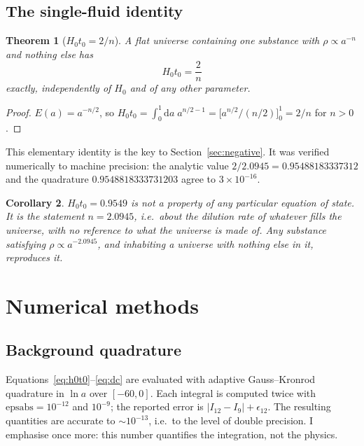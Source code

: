 \documentclass[11pt,a4paper]{article}
\newtheorem{theorem}{Theorem}[section]
\newtheorem{corollary}[theorem]{Corollary}
\theoremstyle{definition}
\newcommand{\Hzt}{H_0 t_0}
\begin{document}
\subsection{The single-fluid identity}

\begin{theorem}[$\Hzt = 2/n$]
\label{thm:twon}
A flat universe containing one substance with $\rho \propto a^{-n}$ and
nothing else has
\begin{equation}
\Hzt = \frac{2}{n}
\label{eq:twon}
\end{equation}
exactly, independently of $H_0$ and of any other parameter.
\end{theorem}

\begin{proof}
$E(a) = a^{-n/2}$, so
$\Hzt = \int_0^1 \mathrm{d}a\; a^{n/2-1} = \big[a^{n/2}/(n/2)\big]_0^1 = 2/n$
for $n > 0$.
\end{proof}

This elementary identity is the key to Section~\ref{sec:negative}. It was
verified numerically to machine precision: the analytic value
$2/2.0945 = 0.95488183337312$ and the quadrature
$0.9548818333731203$ agree to $3\times10^{-16}$.

\begin{corollary}
$\Hzt = 0.9549$ is not a property of any particular equation of state. It is
the statement $n = 2.0945$, i.e.\ about the \emph{dilution rate of whatever
fills the universe}, with no reference to what the universe is made of. Any
substance satisfying $\rho \propto a^{-2.0945}$, and inhabiting a universe
with nothing else in it, reproduces it.
\end{corollary}

\section{Numerical methods}
\label{sec:methods}

\subsection{Background quadrature}

Equations~\eqref{eq:h0t0}--\eqref{eq:dc} are evaluated with adaptive
Gauss--Kronrod quadrature in $\ln a$ over $[-60, 0]$. Each integral is
computed twice with $\mathrm{epsabs} = 10^{-12}$ and $10^{-9}$; the reported
error is $|I_{12} - I_9| + \epsilon_{12}$. The resulting quantities are
accurate to $\sim 10^{-13}$, i.e.\ to the level of double precision. I
emphasise once more: this number quantifies the integration, not the physics.
\end{document}
